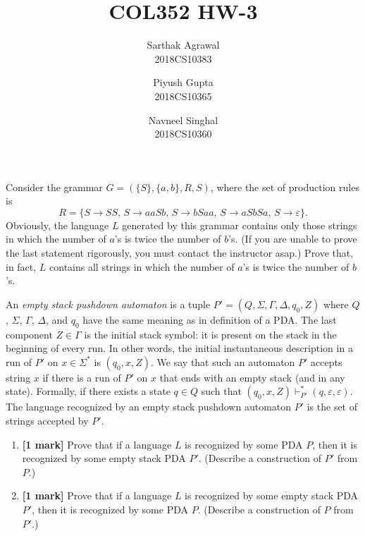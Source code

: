 \documentclass[10pt,addpoints]{exam}
\title{COL352 HW-3}
\author{
Sarthak Agrawal \\ 2018CS10383
\and
Piyush Gupta \\ 2018CS10365
\and
Navneel Singhal \\ 2018CS10360
}
\begin{document}
\maketitle

%
%

\begin{prob}
Consider the grammar $G=(\{S\},\{a,b\},R,S)$, where the set of production rules is
\[R=\{S\longrightarrow SS\text{, }S\longrightarrow aaSb\text{, }S\longrightarrow bSaa\text{, }S\longrightarrow aSbSa\text{, }S\longrightarrow\varepsilon\}\text{.}\]
Obviously, the language $L$ generated by this grammar contains only those strings in which the number of $a$'s is twice the number of $b$'s. (If you are unable to prove the last statement rigorously, you must contact the instructor asap.) Prove that, in fact, $L$ contains all strings in which  the number of $a$'s is twice the number of $b$'s.
\end{prob}


\newpage
\begin{prob}
An \textit{empty stack pushdown automaton} is a tuple $P'=(Q,\Sigma,\Gamma,\Delta,q_0,Z)$ where $Q$, $\Sigma$, $\Gamma$, $\Delta$, and $q_0$ have the same meaning as in definition of a PDA. The last component $Z\in\Gamma$ is the initial stack symbol: it is present on the stack in the beginning of every run. In other words, the initial instantaneous description in a run of $P'$ on $x\in\Sigma^*$ is $(q_0,x,Z)$. We say that such an automaton $P'$ accepts string $x$ if there is a run of $P'$ on $x$ that ends with an empty stack (and in any state). Formally,  if there exists a state $q\in Q$ such that $(q_0,x,Z)\vdash^*_{P'}(q,\varepsilon,\varepsilon)$. The language recognized by an empty stack pushdown automaton $P'$ is the set of strings accepted by $P'$.
\begin{enumerate}
\item \textbf{[1 mark]} Prove that if a language $L$ is recognized by some PDA $P$, then it is recognized by some empty stack PDA $P'$. (Describe a construction of $P'$ from $P$.)
\item \textbf{[1 mark]} Prove that if a language $L$ is recognized by some empty stack PDA $P'$, then it is recognized by some PDA $P$. (Describe a construction of $P$ from $P'$.)
\end{enumerate}
\end{prob}

\end{document}
